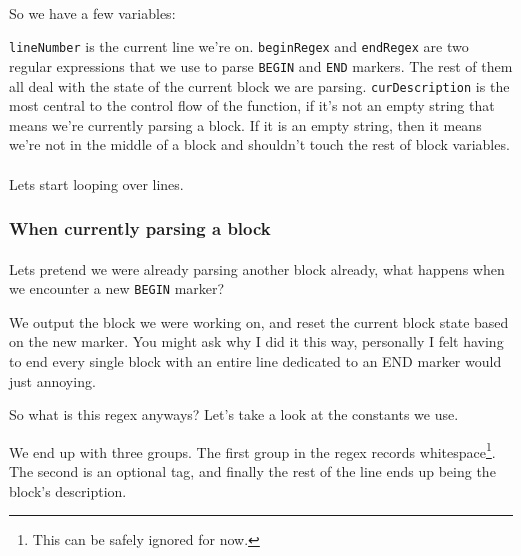 \documentclass{article}
\begin{document}
\paragraph{}
So we have a few variables:


\texttt{lineNumber} is the current line we're on. \texttt{beginRegex} and
\texttt{endRegex} are two regular expressions that we use to parse \texttt{BEGIN}
and \texttt{END} markers. The rest of them all deal with the state of the
current block we are parsing. \texttt{curDescription} is the most central to
the control flow of the function, if it's not an empty string that means we're
currently parsing a block. If it is an empty string, then it means we're not in
the middle of a block and shouldn't touch the rest of block variables.

\paragraph{}
Lets start looping over lines.


\subsubsection{When currently parsing a block}

\paragraph{}
Lets pretend we were already parsing another block already, what happens when we
encounter a new \texttt{BEGIN} marker?

We output the block we were working on, and reset the current block state based
on the new marker. You might ask why I did it this way, personally I felt having
to end every single block with an entire line dedicated to an END marker would
just annoying.


So what is this regex anyways? Let's take a look at the constants we use.


We end up with three groups. The first group in the regex records
whitespace\footnote{This can be safely ignored for now.}. The second is an
optional tag, and finally the rest of the line ends up being the block's
description.
\end{document}

